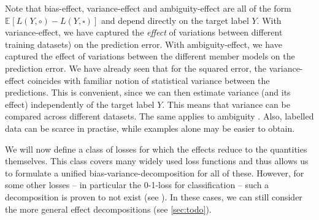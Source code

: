 \documentclass[../main.tex]{subfiles}
\begin{document}

Note that bias-effect, variance-effect and ambiguity-effect are all of the form $\mathbb{E}_{}\left[ L(Y, \circ) - L(Y, \square) \right]$ and depend directly on the target label $Y$. 
With variance-effect, we have captured the \textit{effect} of variations between different training datasets) on the prediction error.
With ambiguity-effect, we have captured the effect of variations between the different member models on the prediction error.
We have already seen that for the squared error, the variance-effect coincides with familiar notion of statistical variance between the predictions.
This is convenient, since we can then estimate variance (and its effect) independently of the target label $Y$.
This means that variance can be compared across different datasets.
The same applies to ambiguity .
Also, labelled data can be scarce in practise, while examples alone may be easier to obtain. 

We will now define a class of losses for which the effects reduce to the quantities themselves. This class covers many widely used loss functions and thus allows us to formulate a unified bias-variance-decomposition for all of these. However, for some other losses -- in particular the 0-1-loss for classification -- such a decomposition is proven to not exist (see \cite{todo}). In these cases, we can still consider the more general effect decompositions (see \ref{sec:todo}).
\end{document}
